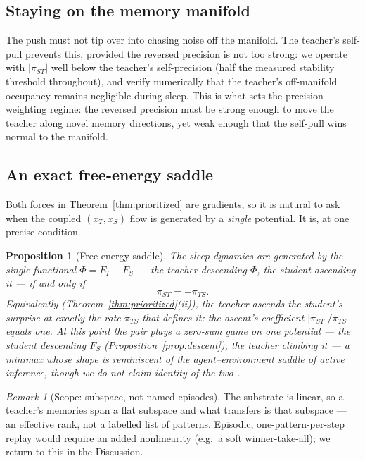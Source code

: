 \documentclass[10pt,letterpaper]{article}
\theoremstyle{plain}
\newtheorem{proposition}{Proposition}
\theoremstyle{remark}
\newtheorem{remark}{Remark}
\newcommand{\xT}{x_T}
\newcommand{\xS}{x_S}
\newcommand{\FS}{F_S}
\newcommand{\FT}{F_T}
\newcommand{\piTS}{\pi_{TS}}
\newcommand{\piST}{\pi_{ST}}
\begin{document}
\subsection{Staying on the memory manifold}
The push must not tip over into chasing noise off the manifold. The teacher's self-pull prevents this,
provided the reversed precision is not too strong: we operate with $|\piST|$ well below the teacher's
self-precision (half the measured stability threshold throughout), and verify numerically that the
teacher's off-manifold occupancy remains negligible during sleep. This is what sets the
precision-weighting regime: the reversed precision must be strong enough to move the teacher along
novel memory directions, yet weak enough that the self-pull wins normal to the manifold.

\subsection{An exact free-energy saddle}
Both forces in Theorem~\ref{thm:prioritized} are gradients, so it is natural to ask when the coupled
$(\xT,\xS)$ flow is generated by a \emph{single} potential. It is, at one precise condition.

\begin{proposition}[Free-energy saddle]
\label{prop:saddle}
The sleep dynamics are generated by the single functional $\Phi=\FT-\FS$ --- the teacher descending
$\Phi$, the student ascending it --- if and only if
\begin{equation}
\label{eq:saddle}
\piST=-\piTS.
\end{equation}
Equivalently (Theorem~\ref{thm:prioritized}(ii)), the teacher ascends the student's surprise at exactly
the rate $\piTS$ that defines it: the ascent's coefficient $|\piST|/\piTS$ equals one. At this point the
pair plays a zero-sum game on one potential --- the student descending $\FS$
(Proposition~\ref{prop:descent}), the teacher climbing it --- a minimax whose shape is reminiscent of
the agent--environment saddle of active inference, though we do not claim identity of the two
\cite{friston2017process,millidge2021whence}.
\end{proposition}

\begin{remark}[Scope: subspace, not named episodes]
\label{rem:scope}
The substrate is linear, so a teacher's memories span a flat subspace and what transfers is that
subspace --- an effective rank, not a labelled list of patterns. Episodic, one-pattern-per-step replay
would require an added nonlinearity (e.g.\ a soft winner-take-all); we return to this in the Discussion.
\end{remark}
\end{document}
